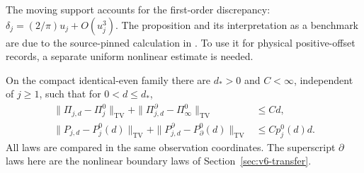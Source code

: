 The moving support accounts for the first-order discrepancy: $\delta_j=(2/\pi)u_j+O(u_j^3)$. The proposition and its interpretation as a benchmark are due to the source-pinned calculation in \citet{RefereeV6}. To use it for physical positive-offset records, a separate uniform nonlinear estimate is needed.

\begin{lemma}
\label{lem:v7-tangent}
On the compact identical-even family there are $d_*>0$ and $C<\infty$, independent of $j\ge1$, such that for $0<d\le d_*$,
\begin{align}
 \|\Pi_{j,d}-\Pi_j^0\|_{\mathrm{TV}}
 +\|\Pi^\partial_{j,d}-\Pi_\infty^0\|_{\mathrm{TV}}&\le Cd,
                                                    \label{eq:v7-tangent-selected}\\
 \|P_{j,d}-P_j^0(d)\|_{\mathrm{TV}}
 +\|P^\partial_{j,d}-P_\partial^0(d)\|_{\mathrm{TV}}
       &\le Cp_j^0(d)d.\label{eq:v7-tangent-raw}
\end{align}
All laws are compared in the same observation coordinates. The superscript $\partial$ laws here are the nonlinear boundary laws of Section~\ref{sec:v6-transfer}.
\end{lemma}
